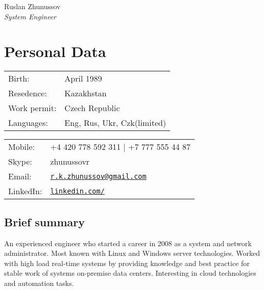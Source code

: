 \documentclass[a4paper,10pt]{article}
\def\name{Ruslan Zhunussov}
\begin{document}
{\huge \name \\}
\textit{System Engineer}

\section*{Personal Data}
\begin{minipage}{0.45\linewidth}
    \begin{tabular}{ll}
        Birth: &  April 1989\\
        Resedence: &  Kazakhstan \\
        Work permit: & Czech Republic \\
        Languages: & Eng, Rus, Ukr, Czk(limited) \\
      \end{tabular}
\end{minipage}
\begin{minipage}{0.45\linewidth}
    \begin{tabular}{ll}
      Mobile: & +4 420 778 592 311 | +7 777 555 44 87 \\
      Skype: &  zhunussovr \\
      Email: & \href{mailto:r.k.zhunussov@gmail.com}{\tt r.k.zhunussov@gmail.com} \\
      LinkedIn: & \href{https://www.linkedin.com/in/ruslan-zhunussov-6b575a5a}{\tt linkedin.com/} \\
    \end{tabular}
\end{minipage}

\subsection*{Brief summary}
\textnormal{An experienced engineer who started a career in 2008 as a system and network administrator.  
Most known with Linux and Windows server technologies. Worked with high load real-time systems by providing 
knowledge and best practice for stable work of systems on-premise data centers. Interesting in cloud technologies and automation tasks.  
}
\end{document}
